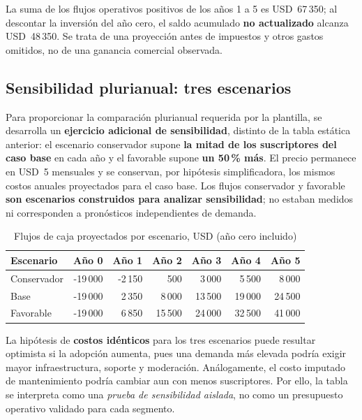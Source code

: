 La suma de los flujos operativos positivos de los años 1 a 5 es USD~67\,350; al descontar la inversión del año cero, el saldo acumulado \textbf{no actualizado} alcanza USD~48\,350. Se trata de una proyección antes de impuestos y otros gastos omitidos, no de una ganancia comercial observada.

\subsection{Sensibilidad plurianual: tres escenarios}\label{subsec:ml-sensibilidad-plurianual}

Para proporcionar la comparación plurianual requerida por la plantilla, se desarrolla un \textbf{ejercicio adicional de sensibilidad}, distinto de la tabla estática anterior: el escenario conservador supone \textbf{la mitad de los suscriptores del caso base} en cada año y el favorable supone \textbf{un 50\,\% más}. El precio permanece en USD~5 mensuales y se conservan, por hipótesis simplificadora, los mismos costos anuales proyectados para el caso base. Los flujos conservador y favorable \textbf{son escenarios construidos para analizar sensibilidad}; no estaban medidos ni corresponden a pronósticos independientes de demanda.

\begin{table}[htbp]
\centering
\caption{Flujos de caja proyectados por escenario, USD (año cero incluido)}
\label{tab:ml-flujo-escenarios}
\scriptsize
\setlength{\tabcolsep}{4pt}
\begin{tabular}{@{}lrrrrrr@{}}
\toprule
\textbf{Escenario} & \textbf{Año 0} & \textbf{Año 1} & \textbf{Año 2} & \textbf{Año 3} & \textbf{Año 4} & \textbf{Año 5} \\
\midrule
Conservador & -19\,000 & -2\,150 & 500 & 3\,000 & 5\,500 & 8\,000 \\
Base & -19\,000 & 2\,350 & 8\,000 & 13\,500 & 19\,000 & 24\,500 \\
Favorable & -19\,000 & 6\,850 & 15\,500 & 24\,000 & 32\,500 & 41\,000 \\
\bottomrule
\end{tabular}
\end{table}

La hipótesis de \textbf{costos idénticos} para los tres escenarios puede resultar optimista si la adopción aumenta, pues una demanda más elevada podría exigir mayor infraestructura, soporte y moderación. Análogamente, el costo imputado de mantenimiento podría cambiar aun con menos suscriptores. Por ello, la tabla se interpreta como una \textit{prueba de sensibilidad aislada}, no como un presupuesto operativo validado para cada segmento.


